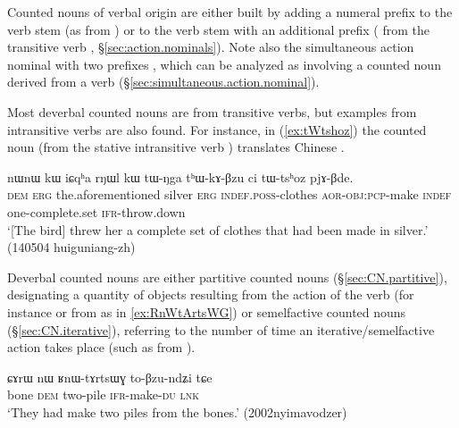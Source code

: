 Counted nouns of verbal origin are either built by adding a numeral prefix to the verb stem (as  from ) or to the verb stem with an additional prefix  ( from the transitive verb , §\ref{sec:action.nominals}). Note also the simultaneous action nominal with two prefixes , which can be analyzed as involving a counted noun derived from a verb (§\ref{sec:simultaneous.action.nominal}). 

Most deverbal counted nouns are from transitive verbs, but examples from intransitive verbs are also found. For instance, in (\ref{ex:tWtshoz}) the counted noun  (from the stative intransitive verb ) translates Chinese .

\begin{exe}
\ex \label{ex:tWtshoz}
\gll nɯnɯ kɯ iɕqʰa rŋɯl kɯ tɯ-ŋga tʰɯ-kɤ-βzu ci tɯ-tsʰoz pjɤ-βde. \\
\textsc{dem} \textsc{erg} the.aforementioned silver \textsc{erg} \textsc{indef}.\textsc{poss}-clothes \textsc{aor}-\textsc{obj}:\textsc{pcp}-make \textsc{indef} one-complete.set \textsc{ifr}-throw.down \\
\glt `[The bird] threw her a complete set of clothes that had been made in silver.'  (140504 huiguniang-zh)
\end{exe}

Deverbal counted nouns are either partitive counted nouns (§\ref{sec:CN.partitive}), designating a quantity of objects resulting from the action of the verb (for instance  or  from  as in \ref{ex:RnWtArtsWG}) or semelfactive counted nouns (§\ref{sec:CN.iterative}), referring to the number of time an iterative/semelfactive action takes place (such as  from ).

\begin{exe}
\ex \label{ex:RnWtArtsWG}
\gll ɕɤrɯ nɯ ʁnɯ-tɤrtsɯɣ to-βzu-ndʑi tɕe \\
bone \textsc{dem} two-pile \textsc{ifr}-make-\textsc{du} \textsc{lnk} \\
\glt `They had make two piles from the bones.' (2002nyimavodzer)
\end{exe}

